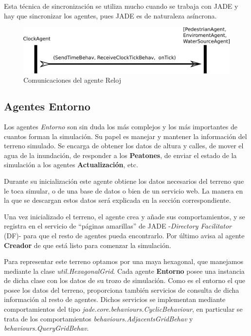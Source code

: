 Esta técnica de sincronización se utiliza mucho cuando se trabaja con JADE y
hay que sincronizar los agentes, pues JADE es de naturaleza asíncrona.

\begin{figure}[H]
 \centering
 \includegraphics[width=120mm]{figuras/cap5/com_clock.png}
 \caption{Comunicaciones del agente Reloj}
\end{figure}

\subsection*{Agentes Entorno}

Los agentes {\em Entorno} son sin duda los más complejos y los más importantes
de cuantos forman la simulación. Su papel es manejar y mantener la información
del terreno simulado. Se encarga de obtener los datos de altura y calles, de
mover el agua de la inundación, de responder a los {\bf Peatones}, de enviar el
estado de la simulación a los agentes {\bf Actualización}, etc.

Durante su inicialización este agente obtiene los datos necesarios del terreno
que le toca simular, o de una base de datos o bien de un servicio web. La manera
en la que se descargan estos datos será explicada en la sección correspondiente.

Una vez inicializado el terreno, el agente crea y añade sus comportamientos, y
se registra en el servicio de ``páginas amarillas'' de JADE -{\em Directory
Facilitator} (DF)- para que el resto de agentes pueda encontrarlo. Por último
avisa al agente {\bf Creador} de que está listo para comenzar la simulación.

Para representar este terreno optamos por una maya hexagonal, que manejamos
mediante la clase {\em util.HexagonalGrid}. Cada agente {\bf Entorno} posee una
instancia de dicha clase con los datos de su trozo de simulación. Como es el
entorno el que posee los datos del terreno, proporciona también servicios de
consulta de dicha información al resto de agentes. Dichos servicios se
implementan mediante comportamientos del tipo {\em
jade.core.behaviours.CyclicBehaviour}, en particular se trata de los
comportamientos {\em behaviours.AdjacentsGridBehav} y {\em
behaviours.QueryGridBehav}.

